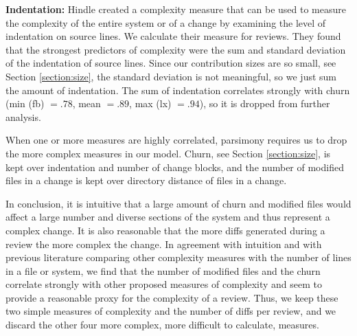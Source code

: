 {\bf Indentation:} Hindle \etal \cite{Hindle2008ICPC} created a complexity
measure that can be used to measure the complexity of the entire system or of a
change by examining the level of indentation on source lines. We calculate
their measure for reviews. They found that the strongest predictors of
complexity were the sum and standard deviation of the indentation of source
lines. Since our contribution sizes are so small, see Section
\ref{section:size}, the standard deviation is not meaningful, so we just sum
the amount of indentation.
%
The sum of indentation correlates strongly with churn (min (fb) $= .78$, mean
$= .89$, max (lx) $= .94$), so it is dropped from further analysis.

When one or more measures are highly correlated, parsimony requires us to drop
the more complex measures in our model. Churn, see Section \ref{section:size},
is kept over indentation and number of change blocks, and the number of
modified files in a change is kept over directory distance of files in a
change. 
 
In conclusion, it is intuitive that a large amount of churn and modified files
would affect a large number and diverse sections of the system and thus
represent a complex change. It is also reasonable that the more diffs generated
during a review the more complex the change.
%
In agreement with intuition and with previous literature comparing other
complexity measures with the number of lines in a file or system, we find that
the number of modified files and the churn correlate strongly with other
proposed measures of complexity and seem to provide a reasonable proxy for the
complexity of a review. Thus, we keep these two simple measures of complexity
and the number of diffs per review, and we discard the other four more complex,
\ie more difficult to calculate, measures.


